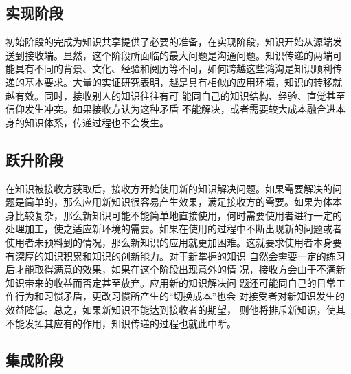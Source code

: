 \documentclass[12pt,a4paper]{ctexart}
\begin{document}
\subsection{实现阶段}
初始阶段的完成为知识共享提供了必要的准备，在实现阶段，知识开始从源端发
送到接收端。显然，这个阶段所面临的最大问题是沟通问题。知识传递的两端可
能具有不同的背景、文化、经验和阅历等不同，如何跨越这些鸿沟是知识顺利传
递的基本要求。大量的实证研究表明，越是具有相似的应用环境，知识的转移就
越有效。同时，接收别人的知识往往有可
能同自己的知识结构、经验、直觉甚至信仰发生冲突。如果接收方认为这种矛盾
不能解决，或者需要较大成本融合进本身的知识体系，传递过程也不会发生。


\subsection{跃升阶段}

在知识被接收方获取后，接收方开始使用新的知识解决问题。如果需要解决的问
题是简单的，那么应用新知识很容易产生效果，满足接收方的需要。如果为体本
身比较复杂，那么新知识可能不能简单地直接使用，何时需要使用者进行一定的
处理加工，使之适应新环境的需要。如果在使用的过程中不断出现新的问题或者
使用者未预料到的情况，那么新知识的应用就更加困难。这就要求使用者本身要
有深厚的知识积累和知识的创新能力。对于新掌握的知识
自然会需要一定的练习后才能取得满意的效果，如果在这个阶段出现意外的情
况，接收方会由于不满新知识带来的收益而否定甚至放弃。应用新的知识解决问
题还可能同自己的日常工作行为和习惯矛盾，更改习惯所产生的“切换成本”也会
对接受者对新知识发生的效益降低。总之，如果新知识不能达到接收者的期望，
则他将排斥新知识，使其不能发挥其应有的作用，知识传递的过程也就此中断。

\subsection{集成阶段}
\end{document}
